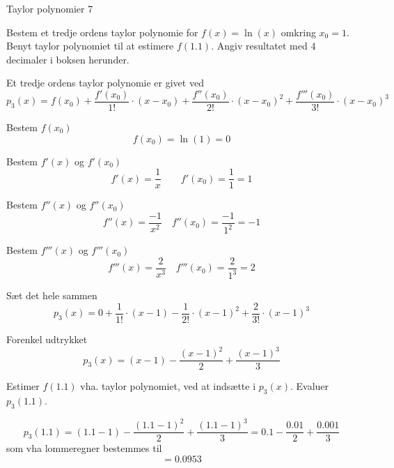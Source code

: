 \documentclass{article}
\begin{document}
\begin{exercise}{Taylor polynomier 7}

Bestem et tredje ordens taylor polynomie for $f(x) =\ln(x)$
omkring $x_0 = 1$.
Benyt taylor polynomiet til at estimere $f(1.1)$.
Angiv resultatet med 4 decimaler i boksen herunder.

\hint
Et tredje ordens taylor polynomie
er givet ved
\[
p_3(x) = f(x_0) + \frac{f'(x_0)}{1!} \cdot (x - x_0)
+ \frac{f''(x_0)}{2!} \cdot (x - x_0)^2
+ \frac{f'''(x_0)}{3!} \cdot (x - x_0)^3
\]


\hint
Bestem $f(x_0)$
\[
f(x_0) = \ln(1) = 0
\]

\hint
Bestem $f'(x)$ og $f'(x_0)$
\[
f'(x) = \frac{1}{x} \qquad f'(x_0) = \frac{1}{1} = 1
\]

\hint
Bestem $f''(x)$ og $f''(x_0)$
\[
f''(x) =\frac{-1}{x^2} \quad f''(x_0) = \frac{-1}{1^2} = -1
\]

\hint
Bestem $f'''(x)$ og $f'''(x_0)$
\[
f'''(x) =\frac{2}{x^3} \quad f'''(x_0) = \frac{2}{1^3} = 2
\]

\hint
Sæt det hele sammen
\[
p_3(x) = 0 + \frac{1}{1!} \cdot (x - 1) - \frac{1}{2!} \cdot (x - 1)^2 + \frac{2}{3!} \cdot (x - 1)^3
\]

\hint
Forenkel udtrykket
\[
p_3(x) = (x - 1) - \frac{(x - 1)^2}{2} + \frac{(x - 1)^3}{3}
\]

\hint
Estimer $f(1.1)$ vha. taylor polynomiet, ved at indsætte i $p_3(x)$.
Evaluer $p_3(1.1)$.

\hint
\[
p_3(1.1) = (1.1 - 1) - \frac{(1.1 - 1)^2}{2} + \frac{(1.1 - 1)^3}{3} = 0.1 - \frac{0.01}{2} + \frac{0.001}{3}
\]
som vha lommeregner bestemmes til
\[
= 0.0953
\]
\end{exercise}
\end{document}
